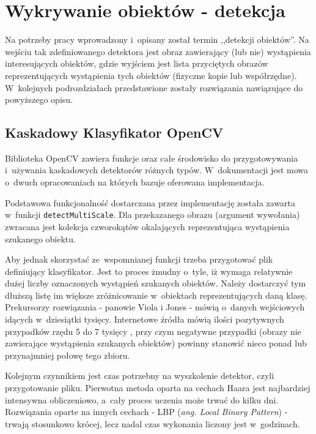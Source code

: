 \section{Wykrywanie obiektów - detekcja}

Na potrzeby pracy wprowadzony i~opisany został termin 
,,detekcji obiektów''. Na wejściu tak zdefiniowanego detektora
jest obraz zawierający (lub nie) wystąpienia interesujących obiektów, gdzie
wyjściem jest lista przyciętych obrazów reprezentujących wystąpienia tych
obiektów (fizyczne kopie lub współrzędne). W~kolejnych podrozdziałach
przedstawione zostały rozwiązania nawiązujące do powyższego opisu.

\subsection{Kaskadowy Klasyfikator OpenCV}

Biblioteka OpenCV zawiera funkcje oraz całe środowisko do przygotowywania
i~używania kaskadowych detektorów różnych typów. W~dokumentacji
\cite{OCV:cascadeclassification}
jest mowa o~dwuch opracowaniach \cite{DBLP:conf/cvpr/ViolaJ01,
DBLP:conf/icip/LienhartM02} na których bazuje oferowana
implementacja.

Podstawowa funkcjonalność dostarczana przez implementację została zawarta
w~funkcji \verb|detectMultiScale|\cite{OCV:cascadeclassification}. 
Dla przekazanego obrazu (argument wywołania)
zwracana jest kolekcja czworokątów okalających 
reprezentująca wystąpienia szukanego obiektu.

Aby jednak skorzystać ze~wspomnianej funkcji trzeba przygotować plik
definiujący klasyfikator. Jest to proces żmudny o~tyle, iż wymaga 
relatywnie
dużej liczby oznaczonych wystąpień szukanych obiektów. Należy dostarczyć
tym dłuższą listę im większe zróżnicowanie w~obiektach reprezentujących
daną klasę. Prekursorzy rozwiązania - panowie Viola i Jones - mówią
o~danych wejściowych idących w~dziesiątki tysięcy. Internetowe źródła
mówią ilości pozytywnych przypadków rzędu 5 do 7 tysięcy
\cite{WEB:ocvnaotoshiseo}, przy czym
negatywne przypadki (obrazy nie zawierające wystąpienia szukanych obiektów)
powinny stanowić nieco ponad lub przynajmniej połowę tego zbioru.

Kolejnym czynnikiem jest czas potrzebny na wyszkolenie detektor,
czyli przygotowanie pliku. Pierwotna metoda oparta na cechach Haara
jest najbardziej intensywna obliczeniowo, a~cały proces uczenia
może trwać do kilku dni. Rozwiązania oparte na innych cechach - LBP
(\textit{ang. Local Binary Pattern}) - trwają stosunkowo krócej, lecz
nadal czas wykonania liczony jest w~godzinach.

